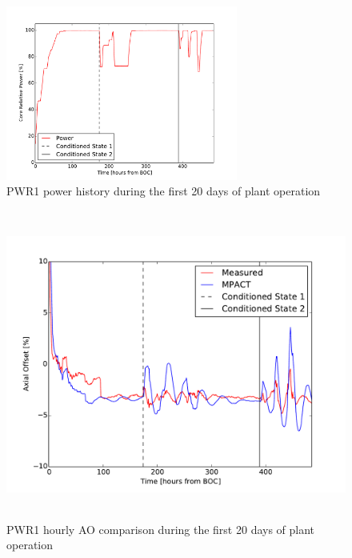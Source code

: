\documentclass[edeposit,fullpage,11pt]{uiucthesis2009}
\begin{document}
\begin{figure}[h]
\begin{center}
\includegraphics[width=3in]{./Figures/M_power_his.pdf} 
\end{center}
\caption{PWR1 power history during the first 20 days of plant operation}
\label{fig:lf_his0}
\end{figure}
\begin{figure}[h]
\begin{center}
\includegraphics[height=4in]{./Figures/M_AO.pdf} 
\end{center}
\caption{PWR1 hourly \gls{AO} comparison during the first 20 days of plant operation}
\label{fig:lf_his1}
\end{figure}
\end{document}
